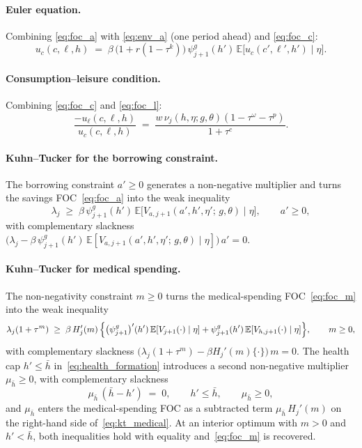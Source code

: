 \documentclass[12pt,a4paper]{article}
\newcommand{\E}{\mathbb{E}}
\begin{document}
\paragraph{Euler equation.} Combining \eqref{eq:foc_a} with \eqref{eq:env_a} (one period ahead) and \eqref{eq:foc_c}:
\begin{equation}
\label{eq:euler}
u_c(c, \ell, h) \;=\; \beta\, \bigl(1 + r(1-\tau^k)\bigr)\, \psi_{j+1}^{g}(h')\, \E\bigl[u_c(c', \ell', h') \mid \eta\bigr].
\end{equation}
 
\paragraph{Consumption--leisure condition.} Combining \eqref{eq:foc_c} and \eqref{eq:foc_l}:
\begin{equation}
\label{eq:cons_leisure}
\frac{-u_\ell(c, \ell, h)}{u_c(c, \ell, h)}
\;=\;
\frac{w\, \nu_j(h, \eta; g, \theta)(1-\tau^\omega-\tau^p)}{1 + \tau^c}.
\end{equation}
 
\paragraph{Kuhn--Tucker for the borrowing constraint.}
The borrowing constraint $a' \geq 0$ generates a non-negative multiplier and turns the savings FOC~\eqref{eq:foc_a} into the weak inequality
\begin{equation}
\label{eq:kt_borrowing}
\lambda_j \;\geq\; \beta\, \psi_{j+1}^{g}(h')\, \E\bigl[V_{a, j+1}(a', h', \eta';\, g, \theta) \mid \eta\bigr], \qquad a' \geq 0,
\end{equation}
with complementary slackness $\bigl(\lambda_j - \beta\, \psi_{j+1}^{g}(h')\, \E[V_{a, j+1}(a', h', \eta';\, g, \theta) \mid \eta]\bigr)\, a' = 0$.

\paragraph{Kuhn--Tucker for medical spending.}
The non-negativity constraint $m \geq 0$ turns the medical-spending FOC~\eqref{eq:foc_m} into the weak inequality
\begin{equation}
\label{eq:kt_medical}
\lambda_j (1 + \tau^m)
\;\geq\;
\beta\, H_j'(m)\,\Bigl\{
\bigl(\psi_{j+1}^{g}\bigr)'(h')\, \E[V_{j+1}(\cdot) \mid \eta]
+ \psi_{j+1}^{g}(h')\, \E[V_{h, j+1}(\cdot) \mid \eta]
\Bigr\}, \qquad m \geq 0,
\end{equation}
with complementary slackness $\bigl(\lambda_j (1+\tau^m) - \beta H_j'(m)\{\cdot\}\bigr)\, m = 0$. The health cap $h' \leq \bar h$ in~\eqref{eq:health_formation} introduces a second non-negative multiplier $\mu_{\bar h} \geq 0$, with complementary slackness
\begin{equation}
\label{eq:kt_healthcap}
\mu_{\bar h}\,(\bar h - h') \;=\; 0, \qquad h' \leq \bar h, \qquad \mu_{\bar h} \geq 0,
\end{equation}
and $\mu_{\bar h}$ enters the medical-spending FOC as a subtracted term $\mu_{\bar h}\, H_j'(m)$ on the right-hand side of~\eqref{eq:kt_medical}. At an interior optimum with $m > 0$ and $h' < \bar h$, both inequalities hold with equality and~\eqref{eq:foc_m} is recovered.
\end{document}

